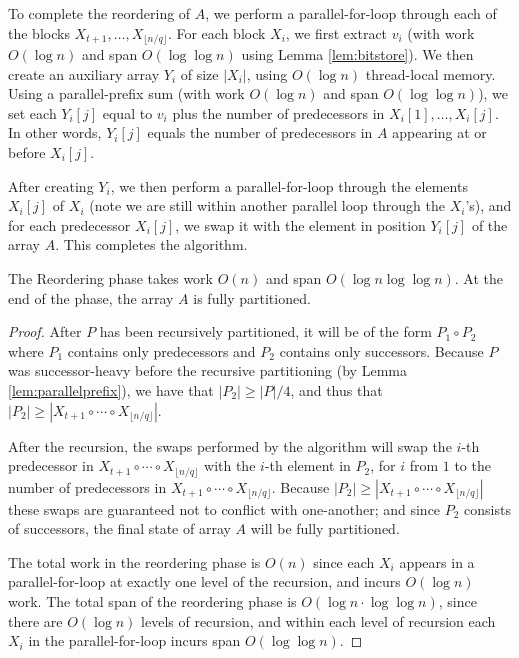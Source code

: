 \documentclass[a4paper,UKenglish,cleveref, autoref, thm-restate]{lipics-v2019}
\begin{document}
To complete the reordering of $A$, we perform a parallel-for-loop
through each of the blocks $X_{t + 1}, \ldots, X_{\lfloor n / q \rfloor}$. For each block
$X_i$, we first extract $v_i$ (with work $O(\log n)$ and span $O(\log
\log n)$ using Lemma \ref{lem:bitstore}). We then create an auxiliary
array $Y_i$ of size $|X_i|$, using $O(\log n)$ thread-local
memory. Using a parallel-prefix sum (with work $O(\log n)$ and span
$O(\log \log n)$), we set each $Y_i[j]$ equal to $v_i$ plus the number
of predecessors in $X_i[1], \ldots, X_i[j]$. In other words, $Y_i[j]$
equals the number of predecessors in $A$ appearing at or before
$X_i[j]$.

After creating $Y_i$, we then perform a parallel-for-loop through the
elements $X_i[j]$ of $X_i$ (note we are still within another parallel
loop through the $X_i$'s), and for each predecessor $X_i[j]$, we swap
it with the element in position $Y_i[j]$ of the array $A$. This
completes the algorithm.

\begin{lemma}
 The Reordering phase takes work $O(n)$ and span $O(\log n \log \log
 n)$. At the end of the phase, the array $A$ is fully partitioned.
\end{lemma}
\begin{proof}
  After $P$ has been recursively partitioned, it will be of the form
  $P_1 \circ P_2$ where $P_1$ contains only predecessors and $P_2$
  contains only successors. Because $P$ was successor-heavy before the
  recursive partitioning (by Lemma \ref{lem:parallelprefix}), we have
  that $|P_2| \ge |P| / 4$, and thus that
  $|P_2| \ge |X_{t + 1} \circ \cdots \circ X_{\lfloor n / q
    \rfloor}|$.

After the recursion, the swaps performed by the algorithm will swap
the $i$-th predecessor in $X_{t + 1} \circ \cdots \circ X_{\lfloor n /
  q \rfloor}$ with the $i$-th element in $P_2$, for $i$ from $1$ to
the number of predecessors in $X_{t + 1} \circ \cdots \circ X_{\lfloor
  n / q \rfloor}$. Because $|P_2| \ge |X_{t + 1} \circ \cdots \circ
X_{\lfloor n / q \rfloor}|$ these swaps are guaranteed not to conflict
with one-another; and since $P_2$ consists of successors, the final
state of array $A$ will be fully partitioned.

The total work in the reordering phase is $O(n)$ since each $X_i$
appears in a parallel-for-loop at exactly one level of the recursion,
and incurs $O(\log n)$ work. The total span of the reordering phase is
$O(\log n \cdot \log \log n)$, since there are $O(\log n)$ levels of
recursion, and within each level of recursion each $X_i$ in the
parallel-for-loop incurs span $O(\log \log n)$. 
\end{proof}
\end{document}
